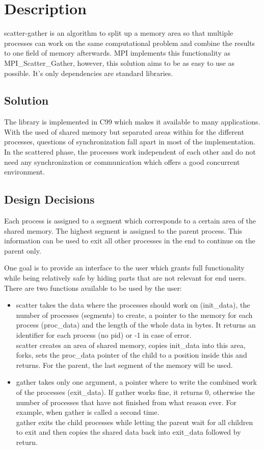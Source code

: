 \documentclass[a4paper]{article}
\begin{document}
\section{Description}

scatter-gather is an algorithm to split up a memory area so that multiple processes can work on the same computational problem and combine the results to one field of memory afterwards. MPI implements this functionality as MPI\_Scatter\_Gather, however, this solution aims to be as easy to use as possible. It's only dependencies are standard libraries.

\subsection{Solution}

The library is implemented in C99 which makes it available to many applications. With the used of shared memory but separated areas within for the different processes, questions of synchronization fall apart in most of the implementation. In the scattered phase, the processes work independent of each other and do not need any synchronization or communication which offers a good concurrent environment. 

\subsection{Design Decisions}

Each process is assigned to a segment which corresponds to a certain area of the shared memory. The highest segment is assigned to the parent process. This information can be used to exit all other processes in the end to continue on the parent only. 

One goal is to provide an interface to the user which grants full functionality while being relatively safe by hiding parts that are not relevant for end users. There are two functions available to be used by the user:

\begin{itemize}
    \item {scatter takes the data where the processes should work on (init\_data), the number of processes (segments) to create, a pointer to the memory for each process (proc\_data) and the length of the whole data in bytes. It returns an identifier for each process (no pid) or -1 in case of error. \\
    scatter creates an area of shared memory, copies init\_data into this area, forks, sets the proc\_data pointer of the child to a position inside this and returns. For the parent, the last segment of the memory will be used. }
    \item {gather takes only one argument, a pointer where to write the combined work of the processes (exit\_data). If gather works fine, it returns 0, otherwise the number of processes that have not finished from what reason ever. For example, when gather is called a second time. \\
    gather exits the child processes while letting the parent wait for all children to exit and then copies the shared data back into exit\_data followed by return.}
\end{itemize}
\end{document}
